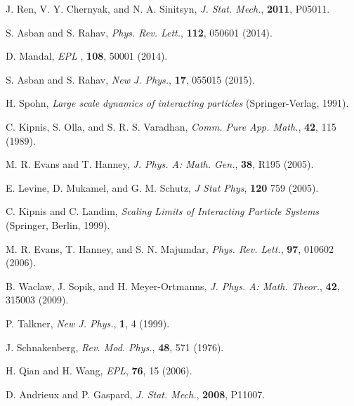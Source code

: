 \documentclass[aps,pre,showpacs,amsmath,amssymb,amsfonts,superscriptaddress,onecolumn,longbibliography]{revtex4-1}
\begin{document}
\begin{thebibliography}{99}
J. Ren, V. Y. Chernyak, and N. A. Sinitsyn, {\em J. Stat.
  Mech.\/}, {\bf 2011}, P05011.

S. Asban  and S. Rahav, {\em Phys. Rev. Lett.\/}, {\bf 112}, 050601 (2014).

D. Mandal, {\em {EPL} \/}, {\bf 108}, 50001 (2014).

S. Asban and S. Rahav, {\em New J. Phys.}, {\bf 17}, 055015 (2015).

H. Spohn, {\em Large scale dynamics of interacting particles\/}
  (Springer-Verlag, 1991).

C. Kipnis, S. Olla, and S. R. S. Varadhan, {\em Comm. Pure
  App. Math.\/}, {\bf 42}, 115 (1989).

M. R. Evans and T. Hanney, {\em J. Phys. A: Math.
  Gen.\/}, {\bf 38}, R195 (2005).

E. Levine, D. Mukamel, and G. M. Schutz, {\em J Stat Phys\/}, {\bf 120} 759 (2005).

C. Kipnis and C. Landim, {\em Scaling Limits of Interacting Particle
  Systems\/} (Springer, Berlin, 1999).

M. R. Evans, T. Hanney, and S. N. Majumdar, {\em Phys. Rev. Lett.}, {\bf 97}, 010602 (2006).

B. Waclaw, J. Sopik, and H. Meyer-Ortmanns, {\em J. Phys. A: Math. Theor.}, {\bf 42}, 315003 (2009).

P. Talkner, {\em New J. Phys.}, {\bf 1}, 4 (1999).

J. Schnakenberg, {\em Rev. Mod. Phys.}, {\bf 48}, 571 (1976).

H. Qian and H. Wang, {\em EPL}, {\bf 76}, 15 (2006).

D. Andrieux and P. Gaspard, {\em J. Stat. Mech.}, {\bf 2008}, P11007.

\end{thebibliography}
\end{document}
